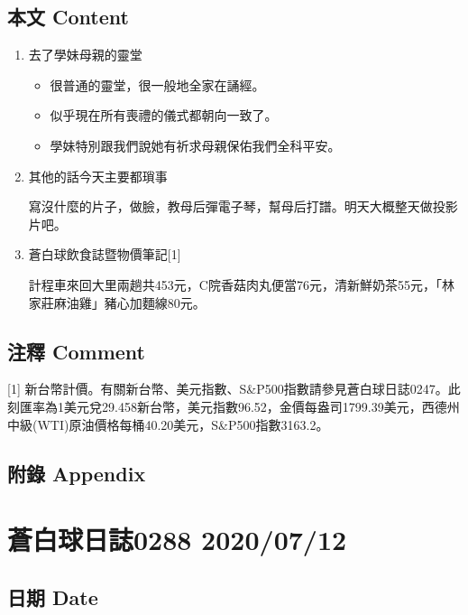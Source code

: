 \documentclass[
]{article}
\providecommand{\tightlist}{%
  \setlength{\itemsep}{0pt}\setlength{\parskip}{0pt}}
\begin{document}
\hypertarget{ux672cux6587-content-9}{%
\subsection{本文 Content}\label{ux672cux6587-content-9}}

\begin{enumerate}
\def\labelenumi{\arabic{enumi}.}
\item
  去了學妹母親的靈堂

  \begin{itemize}
  \tightlist
  \item
    很普通的靈堂，很一般地全家在誦經。
  \item
    似乎現在所有喪禮的儀式都朝向一致了。
  \item
    學妹特別跟我們說她有祈求母親保佑我們全科平安。
  \end{itemize}
\item
  其他的話今天主要都瑣事

  寫沒什麼的片子，做臉，教母后彈電子琴，幫母后打譜。明天大概整天做投影片吧。
\item
  蒼白球飲食誌暨物價筆記{[}1{]}

  計程車來回大里兩趟共453元，C院香菇肉丸便當76元，清新鮮奶茶55元，「林家莊麻油雞」豬心加麵線80元。
\end{enumerate}

\hypertarget{ux6ce8ux91cb-comment-9}{%
\subsection{注釋 Comment}\label{ux6ce8ux91cb-comment-9}}

{[}1{]}
新台幣計價。有關新台幣、美元指數、S\&P500指數請參見蒼白球日誌0247。此刻匯率為1美元兌29.458新台幣，美元指數96.52，金價每盎司1799.39美元，西德州中級(WTI)原油價格每桶40.20美元，S\&P500指數3163.2。

\hypertarget{ux9644ux9304-appendix-9}{%
\subsection{附錄 Appendix}\label{ux9644ux9304-appendix-9}}

\hypertarget{ux84bcux767dux7403ux65e5ux8a8c0288-20200712}{%
\section{蒼白球日誌0288
2020/07/12}\label{ux84bcux767dux7403ux65e5ux8a8c0288-20200712}}

\hypertarget{ux65e5ux671f-date-10}{%
\subsection{日期 Date}\label{ux65e5ux671f-date-10}}
\end{document}
